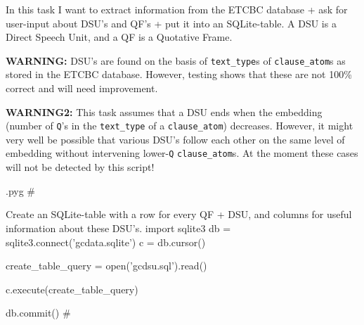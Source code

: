\documentclass{report}
\makeatletter
\newcommand{\mi}[1]{\lstinline{#1}}
\newenvironment{python}{%
  \VerbatimEnvironment
  \minted@resetoptions
  \setkeys{minted@opt}{}
      \begin{VerbatimOut}{\jobname.pyg}}
{%
      \end{VerbatimOut}
      \minted@pygmentize{python}
      \DeleteFile{\jobname.pyg}}
\makeatother
\begin{document}
\begin{multicols}{2}
In this task I want to extract information from the ETCBC database + ask for user-input about DSU's and QF's + put it into an SQLite-table.
A DSU is a Direct Speech Unit, and a QF is a Quotative Frame.

\textbf{WARNING:} DSU's are found on the basis of \mi{text_type}s of \mi{clause_atom}s as stored in the ETCBC database. However, testing shows that these are not 100\% correct and will need improvement.

\textbf{WARNING2:} This task assumes that a DSU ends when the embedding (number of \mi{Q}'s in the \mi{text_type} of a \mi{clause_atom}) decreases.
However, it might very well be possible that various DSU's follow each other on the same level of embedding without intervening lower-\mi{Q} \mi{clause_atom}s.
At the moment these cases will not be detected by this script!
\end{multicols}

\begin{python}
#{{{ Create an SQLite-table with a row for every QF + DSU, and columns for useful information about these DSU's.
import sqlite3
db = sqlite3.connect('gcdata.sqlite')
c = db.cursor()

create_table_query = open('gcdsu.sql').read()

c.execute(create_table_query)

db.commit()
#}}}
\end{python}
\end{document}
